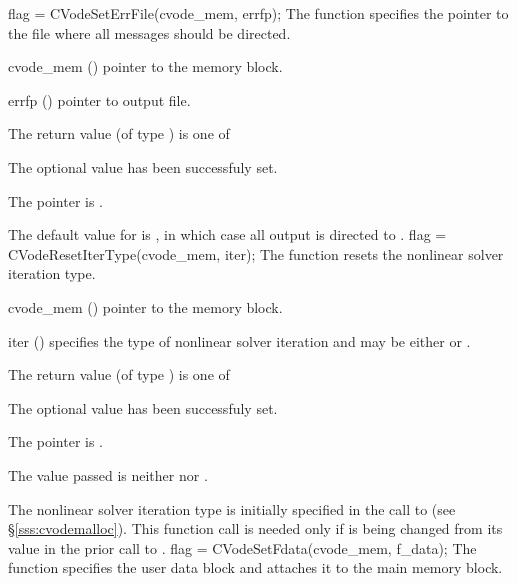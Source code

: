 {
flag = CVodeSetErrFile(cvode\_mem, errfp);
}
{
  The function  specifies the pointer to the file
  where all {\cvode} messages should be directed.
}
{
  \begin{args}
  \item[cvode\_mem] ()
    pointer to the {\cvode} memory block.
  \item[errfp] ()
    pointer to output file.
  \end{args}
}
{
  The return value  (of type ) is one of
  \begin{args}
  \item[\Id{SUCCESS}] 
    The optional value has been successfuly set.
  \item[\Id{CVS\_NO\_MEM}]
    The  pointer is .
  \end{args}
}
{
  The default value for  is , in which case
  all output is directed to .
}
{
flag = CVodeResetIterType(cvode\_mem, iter);
}
{
  The function  resets the nonlinear solver
  iteration type.
}
{
  \begin{args}
  \item[cvode\_mem] ()
    pointer to the {\cvode} memory block.
  \item[iter] ()
    specifies the type of nonlinear solver iteration and may be
    either  or . 
  \end{args}
}
{
  The return value  (of type ) is one of
  \begin{args}
  \item[\Id{SUCCESS}] 
    The optional value has been successfuly set.
  \item[\Id{CVS\_NO\_MEM}]
    The  pointer is .
  \item[\Id{CVS\_ILL\_INPUT}]
    The  value passed is neither  nor .
  \end{args}
}
{
  The nonlinear solver iteration type is initially specified in the call
  to  (see \S\ref{sss:cvodemalloc}). This function call is
  needed only if  is being changed from its value in the prior call 
  to .
}
{
  flag = CVodeSetFdata(cvode\_mem, f\_data);
}
{
  The function  specifies the user data block
  and attaches it to the main {\cvode} memory block.
}
